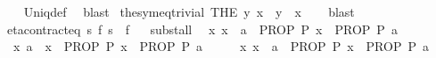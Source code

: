 \begin{isabellebody}
%
\isadelimproof
\ \ %
\endisadelimproof
%
\isatagproof
{}\isamarkupfalse%
\ Uniq{\isacharunderscore}{\kern0pt}def\ \isamarkupfalse%
\ blast%
\endisatagproof
{\isafoldproof}%
%
\isadelimproof
\isanewline
%
\endisadelimproof
\isanewline
{}\isamarkupfalse%
\ the{\isacharunderscore}{\kern0pt}sym{\isacharunderscore}{\kern0pt}eq{\isacharunderscore}{\kern0pt}trivial{\isacharcolon}{\kern0pt}\ {\isachardoublequoteopen}{\isacharparenleft}{\kern0pt}THE\ y{\isachardot}{\kern0pt}\ x\ {\isacharequal}{\kern0pt}\ y{\isacharparenright}{\kern0pt}\ {\isacharequal}{\kern0pt}\ x{\isachardoublequoteclose}\isanewline
%
\isadelimproof
\ \ %
\endisadelimproof
%
\isatagproof
{}\isamarkupfalse%
\ blast%
\endisatagproof
{\isafoldproof}%
%
\isadelimproof
%
\endisadelimproof
%
\isadelimdocument
%
\endisadelimdocument
%
\isatagdocument
%
\isamarkuptrue%
%
\endisatagdocument
{\isafolddocument}%
%
\isadelimdocument
%
\endisadelimdocument
{}\isamarkupfalse%
\ eta{\isacharunderscore}{\kern0pt}contract{\isacharunderscore}{\kern0pt}eq{\isacharcolon}{\kern0pt}\ {\isachardoublequoteopen}{\isacharparenleft}{\kern0pt}{\isasymlambda}s{\isachardot}{\kern0pt}\ f\ s{\isacharparenright}{\kern0pt}\ {\isacharequal}{\kern0pt}\ f{\isachardoublequoteclose}%
\isadelimproof
\ %
\endisadelimproof
%
\isatagproof
\isacommand{{\isachardot}{\kern0pt}{\isachardot}{\kern0pt}}\isamarkupfalse%
%
\endisatagproof
{\isafoldproof}%
%
\isadelimproof
%
\endisadelimproof
\isanewline
\isanewline
{}\isamarkupfalse%
\ subst{\isacharunderscore}{\kern0pt}all{\isacharcolon}{\kern0pt}\isanewline
\ \ {\isacartoucheopen}{\isacharparenleft}{\kern0pt}{\isasymAnd}x{\isachardot}{\kern0pt}\ x\ {\isacharequal}{\kern0pt}\ a\ {\isasymLongrightarrow}\ PROP\ P\ x{\isacharparenright}{\kern0pt}\ {\isasymequiv}\ PROP\ P\ a{\isacartoucheclose}\isanewline
\ \ {\isacartoucheopen}{\isacharparenleft}{\kern0pt}{\isasymAnd}x{\isachardot}{\kern0pt}\ a\ {\isacharequal}{\kern0pt}\ x\ {\isasymLongrightarrow}\ PROP\ P\ x{\isacharparenright}{\kern0pt}\ {\isasymequiv}\ PROP\ P\ a{\isacartoucheclose}\isanewline
%
\isadelimproof
%
\endisadelimproof
%
\isatagproof
{}\isamarkupfalse%
\ {\isacharminus}{\kern0pt}\isanewline
\ \ \isamarkupfalse%
\ {\isacartoucheopen}{\isacharparenleft}{\kern0pt}{\isasymAnd}x{\isachardot}{\kern0pt}\ x\ {\isacharequal}{\kern0pt}\ a\ {\isasymLongrightarrow}\ PROP\ P\ x{\isacharparenright}{\kern0pt}\ {\isasymequiv}\ PROP\ P\ a{\isacartoucheclose}\isanewline
\ \ \isamarkupfalse%

\end{isabellebody}
